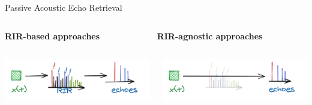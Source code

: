 \begin{frame}[t]{\alert{Passive} Acoustic Echo Retrieval \hfill\faBook}

        \vspace{.5em}
        \begin{columns}[T,onlytextwidth] %
            \begin{column}{.48\textwidth}
                \textbf{RIR-\alert{based} approaches}
            \end{column}
            \begin{column}{.48\textwidth}
                \textbf{RIR-\alert{agnostic} approaches}
            \end{column}%
        \end{columns}

        \vspace{.5em}
        \begin{columns}[onlytextwidth] %
            \begin{column}{.48\textwidth}
                \centering
                \includegraphics[width=.9\textwidth]{./figures/rir_based.png}
            \end{column}
            \begin{column}{.48\textwidth}
                \centering
                \includegraphics[width=.9\textwidth]{./figures/rir_agnostic.png}
            \end{column}%
        \end{columns}


\end{frame}
